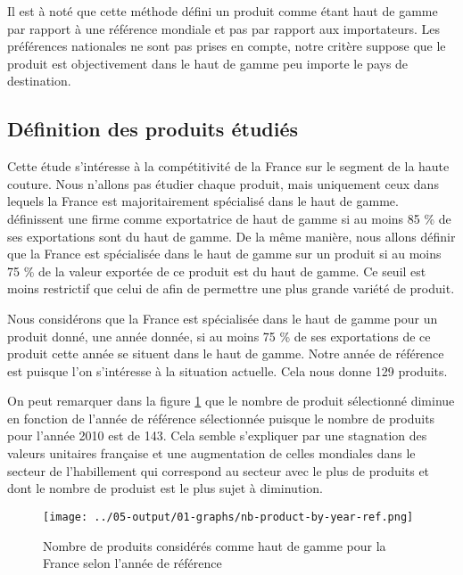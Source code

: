 \documentclass[french,10pt,a4paper]{article}
\begin{document}
Il est à noté que cette méthode défini un produit comme étant haut de gamme par rapport à une référence mondiale et pas par rapport aux importateurs. Les préférences nationales ne sont pas prises en compte, notre critère suppose que le produit est \og objectivement\fg{} dans le haut de gamme peu importe le pays de destination. %

\subsection{Définition des produits étudiés}

Cette étude s'intéresse à la compétitivité de la France sur le segment de la haute couture. Nous n'allons pas étudier chaque produit, mais uniquement ceux dans lequels la France est majoritairement spécialisé dans le haut de gamme. \cite{Martin2015} définissent une firme comme exportatrice de haut de gamme si au moins 85 \% de ses exportations sont du haut de gamme. De la même manière, nous allons définir que la France est spécialisée dans le haut de gamme sur un produit si au moins 75 \% de la valeur exportée de ce produit est du haut de gamme. Ce seuil est moins restrictif que celui de \cite{Martin2015} afin de permettre une plus grande variété de produit. 

Nous considérons que la France est spécialisée dans le haut de gamme pour un produit donné, une année donnée, si au moins 75 \% de ses exportations de ce produit cette année se situent dans le haut de gamme. Notre année de référence est  puisque l'on s'intéresse à la situation actuelle. Cela nous donne 129 produits.

On peut remarquer dans la figure \ref{fig:nb-products-by-year-ref} que le nombre de produit sélectionné diminue en fonction de l'année de référence sélectionnée puisque le nombre de produits pour l'année 2010 est de 143. Cela semble s'expliquer par une stagnation des valeurs unitaires française et une augmentation de celles mondiales dans le secteur de l'habillement qui correspond au secteur avec le plus de produits et dont le nombre de produist est le plus sujet à diminution. 

\begin{figure}[!h]
  \centering
  \texttt{[image: ../05-output/01-graphs/nb-product-by-year-ref.png]}
  \caption{Nombre de produits considérés comme haut de gamme pour la France selon l'année de référence}
  \label{fig:nb-products-by-year-ref}
\end{figure}
\end{document}
